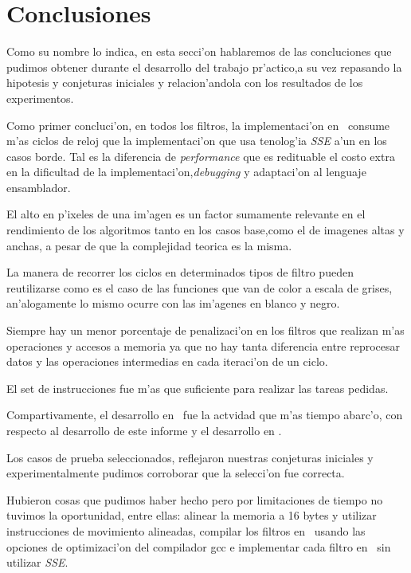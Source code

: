 \section{Conclusiones}
\label{sec:conclusiones}
Como su nombre lo indica, en esta secci'on hablaremos de las concluciones que pudimos obtener durante el desarrollo del 
trabajo pr'actico,a su vez repasando la hipotesis y conjeturas iniciales y relacion'andola con los resultados de los experimentos.

Como primer concluci'on, en todos los filtros, la implementaci'on en \C \ consume m'as ciclos de reloj que la implementaci'on que usa
tenolog'ia \textit{SSE} a'un en los casos borde. Tal es la diferencia de \textit{performance} que es redituable el costo extra en 
la dificultad de la implementaci'on,\textit{debugging} y adaptaci'on al lenguaje ensamblador.

El alto en p'ixeles de una im'agen es un factor sumamente relevante en el rendimiento de los algoritmos tanto en los casos base,como el de
imagenes altas y anchas, a pesar de que la complejidad teorica es la misma.

La manera de recorrer los ciclos en determinados tipos de filtro pueden reutilizarse como es el caso de las funciones que van de color 
a escala de grises, an'alogamente lo mismo ocurre con las im'agenes en blanco y negro.

Siempre hay un menor porcentaje de penalizaci'on en los filtros que realizan m'as operaciones y accesos a memoria ya que 
no hay tanta diferencia entre reprocesar datos y las operaciones intermedias en cada iteraci'on de un ciclo.

El set de instrucciones fue m'as que suficiente para realizar las tareas pedidas.

Compartivamente, el desarrollo en \ass \ fue la actvidad que m'as tiempo abarc'o, con respecto al desarrollo de este informe y
el desarrollo en \C.

Los casos de prueba seleccionados, reflejaron nuestras conjeturas iniciales y experimentalmente pudimos corroborar 
que la selecci'on fue correcta.

Hubieron cosas que pudimos haber hecho pero por limitaciones de tiempo no tuvimos la oportunidad, entre ellas: alinear la memoria a 16 bytes
y utilizar instrucciones de movimiento alineadas, compilar los filtros en \C \ usando las opciones de optimizaci'on del compilador
gcc e implementar cada filtro en \ass \ sin utilizar \textit{SSE}.  

